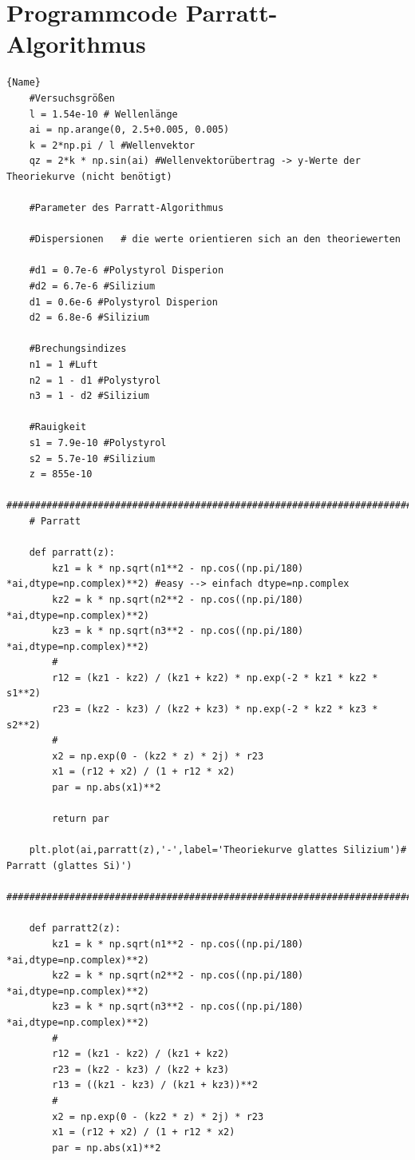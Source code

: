 \section{Programmcode Parratt-Algorithmus}
\begin{lstlisting}{Name}
    #Versuchsgrößen
    l = 1.54e-10 # Wellenlänge
    ai = np.arange(0, 2.5+0.005, 0.005)
    k = 2*np.pi / l #Wellenvektor
    qz = 2*k * np.sin(ai) #Wellenvektorübertrag -> y-Werte der Theoriekurve (nicht benötigt)
    
    #Parameter des Parratt-Algorithmus
    
    #Dispersionen   # die werte orientieren sich an den theoriewerten
                    
    #d1 = 0.7e-6 #Polystyrol Disperion
    #d2 = 6.7e-6 #Silizium 
    d1 = 0.6e-6 #Polystyrol Disperion
    d2 = 6.8e-6 #Silizium 
    
    #Brechungsindizes
    n1 = 1 #Luft
    n2 = 1 - d1 #Polystyrol
    n3 = 1 - d2 #Silizium
    
    #Rauigkeit
    s1 = 7.9e-10 #Polystyrol 
    s2 = 5.7e-10 #Silizium 
    z = 855e-10 
    ########################################################################################################
    # Parratt
    
    def parratt(z):
        kz1 = k * np.sqrt(n1**2 - np.cos((np.pi/180) *ai,dtype=np.complex)**2) #easy --> einfach dtype=np.complex
        kz2 = k * np.sqrt(n2**2 - np.cos((np.pi/180) *ai,dtype=np.complex)**2)
        kz3 = k * np.sqrt(n3**2 - np.cos((np.pi/180) *ai,dtype=np.complex)**2)
        #
        r12 = (kz1 - kz2) / (kz1 + kz2) * np.exp(-2 * kz1 * kz2 * s1**2)
        r23 = (kz2 - kz3) / (kz2 + kz3) * np.exp(-2 * kz2 * kz3 * s2**2)
        #
        x2 = np.exp(0 - (kz2 * z) * 2j) * r23
        x1 = (r12 + x2) / (1 + r12 * x2)
        par = np.abs(x1)**2
    
        return par
    
    plt.plot(ai,parratt(z),'-',label='Theoriekurve glattes Silizium')# Parratt (glattes Si)')
    ########################################################################################################
    
    def parratt2(z):
        kz1 = k * np.sqrt(n1**2 - np.cos((np.pi/180) *ai,dtype=np.complex)**2)
        kz2 = k * np.sqrt(n2**2 - np.cos((np.pi/180) *ai,dtype=np.complex)**2)
        kz3 = k * np.sqrt(n3**2 - np.cos((np.pi/180) *ai,dtype=np.complex)**2)
        #
        r12 = (kz1 - kz2) / (kz1 + kz2)
        r23 = (kz2 - kz3) / (kz2 + kz3)
        r13 = ((kz1 - kz3) / (kz1 + kz3))**2
        #
        x2 = np.exp(0 - (kz2 * z) * 2j) * r23
        x1 = (r12 + x2) / (1 + r12 * x2)
        par = np.abs(x1)**2
        

\end{lstlisting}
